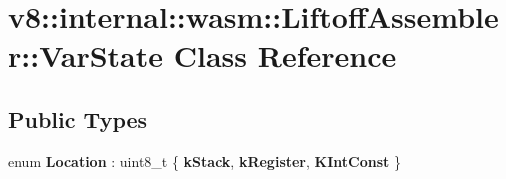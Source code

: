 \hypertarget{classv8_1_1internal_1_1wasm_1_1LiftoffAssembler_1_1VarState}{}\section{v8\+:\+:internal\+:\+:wasm\+:\+:Liftoff\+Assembler\+:\+:Var\+State Class Reference}
\label{classv8_1_1internal_1_1wasm_1_1LiftoffAssembler_1_1VarState}
\subsection*{Public Types}
\begin{DoxyCompactItemize}
\item 
\mbox{\label{classv8_1_1internal_1_1wasm_1_1LiftoffAssembler_1_1VarState_a5b4a578480f4764639bace213f2c546a}} 
enum {\bfseries Location} \+: uint8\+\_\+t \{ {\bfseries k\+Stack}, 
{\bfseries k\+Register}, 
{\bfseries K\+Int\+Const}
 \}
\end{DoxyCompactItemize}
